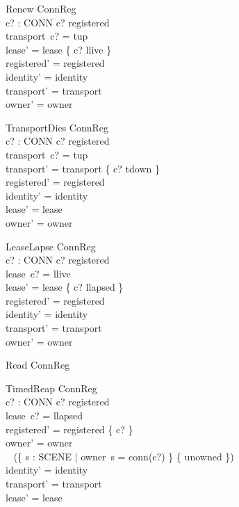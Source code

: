 \documentclass[a4paper,10pt,fleqn]{article}
\begin{document}
\begin{schema}{Renew}
  \Delta ConnReg \\
  c? : CONN
\where
  c? \in registered \\
  transport~c? = tup \\
  lease' = lease \oplus \{ c? \mapsto llive \} \\
  registered' = registered \\
  identity' = identity \\
  transport' = transport \\
  owner' = owner
\end{schema}

\begin{schema}{TransportDies}
  \Delta ConnReg \\
  c? : CONN
\where
  c? \in registered \\
  transport~c? = tup \\
  transport' = transport \oplus \{ c? \mapsto tdown \} \\
  registered' = registered \\
  identity' = identity \\
  lease' = lease \\
  owner' = owner
\end{schema}

\begin{schema}{LeaseLapse}
  \Delta ConnReg \\
  c? : CONN
\where
  c? \in registered \\
  lease~c? = llive \\
  lease' = lease \oplus \{ c? \mapsto llapsed \} \\
  registered' = registered \\
  identity' = identity \\
  transport' = transport \\
  owner' = owner
\end{schema}

\begin{schema}{Read}
  \Xi ConnReg
\end{schema}

\begin{schema}{TimedReap}
  \Delta ConnReg \\
  c? : CONN
\where
  c? \in registered \\
  lease~c? = llapsed \\
  registered' = registered \setminus \{ c? \} \\
  owner' = owner \oplus \\
  \quad~ (\{ s : SCENE | owner~s = conn(c?) \} \cross \{ unowned \}) \\
  identity' = identity \\
  transport' = transport \\
  lease' = lease
\end{schema}
\end{document}
